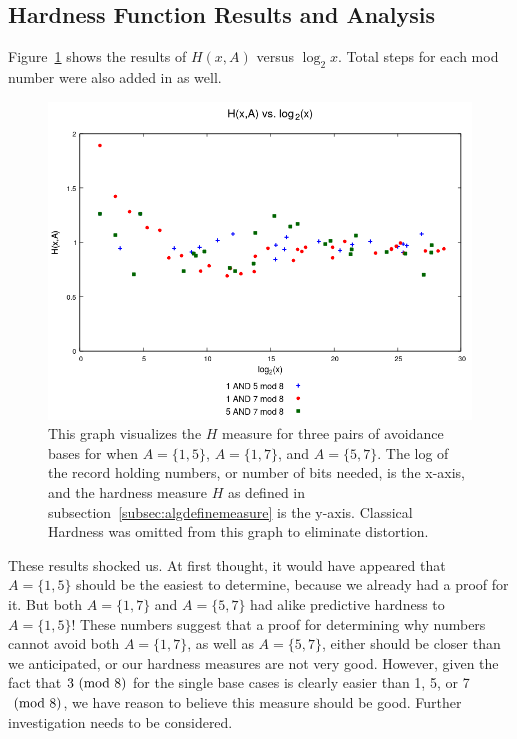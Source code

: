 \subsection{Hardness Function Results and Analysis} \label{subsubsec:algmulhardness}
Figure~\ref{fig:h_multivslog} shows the results of $H(x,A)$ versus $\log_2{x}$. Total steps for each mod number were also added in as well.\par
\begin{figure}

    \centering
    \includegraphics[scale=0.75]{ModAvoidanceAnalysisPics/H_vs_log_multi_base.png}
    \caption{This graph visualizes the $H$ measure for three pairs of avoidance bases for when $A = \{1,5\}$, $A= \{1,7\}$, and $A = \{5,7\}$. The log of the record holding numbers, or number of bits needed, is the x-axis, and the hardness measure $H$ as defined in subsection~\ref{subsec:algdefinemeasure} is the y-axis. Classical Hardness was omitted from this graph to eliminate distortion.}
    \label{fig:h_multivslog}
\end{figure}
These results shocked us. At first thought, it would have appeared that $A = \{1, 5\}$ should be the easiest to determine, because we already had a proof for it. But both $A = \{1, 7\}$ and $A = \{5, 7\}$  had alike predictive hardness to $A = \{1, 5\}$! These numbers suggest that a proof for determining why numbers cannot avoid both $A = \{1, 7\}$, as well as $A = \{5, 7\}$, either should be closer than we anticipated, or our hardness measures are not very good. However, given the fact that $3\ (\mathrm{mod}\ 8)$ for the single base cases is clearly easier than 1, 5, or 7 $\ (\mathrm{mod}\ 8)$, we have reason to believe this measure should be good. Further investigation needs to be considered.


